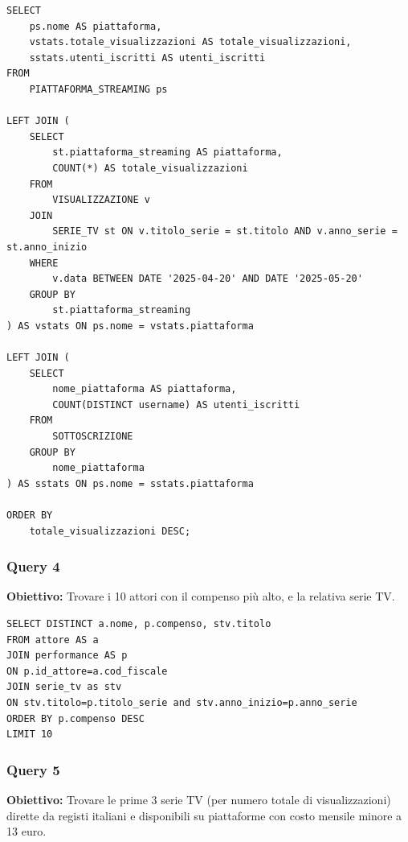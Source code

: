 \documentclass[10pt,a4paper]{article}
\begin{document}
\begin{lstlisting}[caption={Query 3}, label={lst:sql-example}]
SELECT 
    ps.nome AS piattaforma,
	vstats.totale_visualizzazioni AS totale_visualizzazioni,
	sstats.utenti_iscritti AS utenti_iscritti
FROM 
    PIATTAFORMA_STREAMING ps

LEFT JOIN (
    SELECT 
        st.piattaforma_streaming AS piattaforma,
        COUNT(*) AS totale_visualizzazioni
    FROM 
        VISUALIZZAZIONE v
    JOIN 
        SERIE_TV st ON v.titolo_serie = st.titolo AND v.anno_serie = st.anno_inizio
    WHERE 
        v.data BETWEEN DATE '2025-04-20' AND DATE '2025-05-20'
    GROUP BY 
        st.piattaforma_streaming
) AS vstats ON ps.nome = vstats.piattaforma

LEFT JOIN (
    SELECT 
        nome_piattaforma AS piattaforma,
        COUNT(DISTINCT username) AS utenti_iscritti
    FROM 
        SOTTOSCRIZIONE
    GROUP BY 
        nome_piattaforma
) AS sstats ON ps.nome = sstats.piattaforma

ORDER BY 
    totale_visualizzazioni DESC;

\end{lstlisting}
\vspace{1cm}

\subsubsection*{Query 4}
\textbf{Obiettivo:} Trovare i 10 attori con il compenso più alto, e la relativa serie TV.

\vspace{0.5cm}

\begin{lstlisting}[caption={Query 4}, label={lst:sql-example}]
SELECT DISTINCT a.nome, p.compenso, stv.titolo
FROM attore AS a
JOIN performance AS p
ON p.id_attore=a.cod_fiscale
JOIN serie_tv as stv
ON stv.titolo=p.titolo_serie and stv.anno_inizio=p.anno_serie
ORDER BY p.compenso DESC
LIMIT 10

\end{lstlisting}

\vspace{1cm}

\subsubsection*{Query 5}
\textbf{Obiettivo:} Trovare le prime 3 serie TV (per numero totale di visualizzazioni) dirette da registi italiani e disponibili su piattaforme con costo mensile minore a 13 euro.
\end{document}
